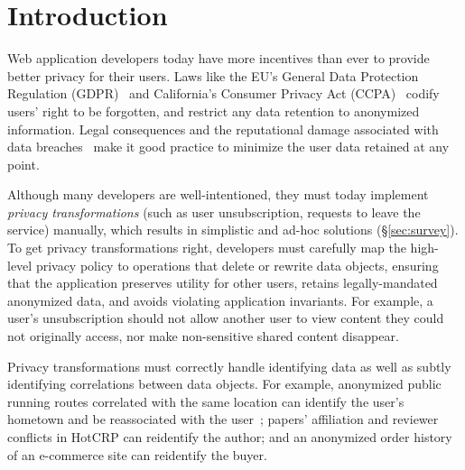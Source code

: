 \section{Introduction}
Web application developers today have more incentives than ever to provide better privacy for their
users.
%
Laws like the EU's General Data Protection Regulation (GDPR)~\cite{eu:gdpr} and California's
Consumer Privacy Act (CCPA)~\cite{ca:privacy-act} codify users' right to be forgotten, and restrict
any data retention to anonymized information.
%
Legal consequences and the reputational damage associated with data breaches~\cite{breach:amazon,
breach:twitter, breach:fb, breach:marriott, breach:quora} make it good practice to minimize the user
data retained at any point.
%

%
Although many developers are well-intentioned, they must today implement \emph{privacy
transformations} (such as user unsubscription, \ie requests to leave the service) 
manually, which results in simplistic and ad-hoc solutions (\S\ref{sec:survey}).
%
To get privacy transformations right, developers must carefully map the high-level privacy
policy to operations that delete or rewrite data objects, ensuring that the application preserves
utility for other users, retains legally-mandated anonymized data, and avoids violating
application invariants.
%
For example, a user's unsubscription should not allow another user to view content they could
not originally access, nor make non-sensitive shared content disappear.
%

%
Privacy transformations must correctly handle identifying data as well as subtly identifying
correlations between data objects.
%
For example, anonymized public running routes correlated with the same location can identify the
user's hometown and be reassociated with the user~\cite{strava:heatmap};
papers' affiliation and reviewer conflicts in HotCRP can reidentify the author; and an anonymized
order history of an e-commerce site can reidentify the buyer.
%

